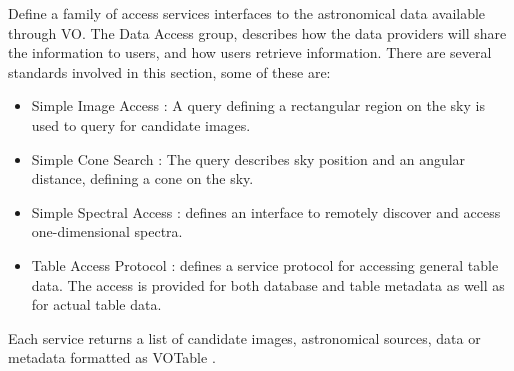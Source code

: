 Define a family of access services interfaces to the astronomical data
available through VO. The Data Access group, describes how the data providers
will share the information to users, and how users retrieve information. There
are several standards involved in this section, some of these are:
\begin{itemize} \itemsep 0.5pt
	\item Simple Image Access \cite{sia}: A query defining a rectangular
region on the sky is used to query for candidate images. 
	\item Simple Cone Search \cite{scs}: The query describes sky position
and an angular distance, defining a cone on the sky. 
	\item Simple Spectral Access \cite{ssa}: defines an interface to
remotely discover and access one-dimensional spectra. 
	\item Table Access Protocol \cite{tap}: defines a service protocol for
accessing general table data. The access is provided for both database and
table metadata as well as for actual table data.
\end{itemize}

Each service returns a list of candidate images, astronomical sources, data or
metadata formatted as VOTable \cite{votable}.
